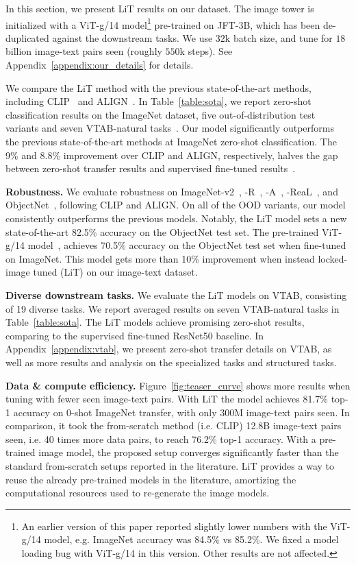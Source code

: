 \documentclass[10pt,twocolumn,letterpaper]{article}
\makeatletter
\def \lit {LiT\xspace}
\renewcommand*{\ie}{i.e.\@\xspace}
\def\objsota{82.5}
\makeatother
\begin{document}
In this section, we present \lit{} results on our dataset.
The image tower is initialized with a ViT-g/14 model\footnote{An earlier version of this paper reported slightly lower numbers with the ViT-g/14 model, e.g. ImageNet accuracy was 84.5\% vs 85.2\%. We fixed a model loading bug with ViT-g/14 in this version. Other results are not affected.} pre-trained on JFT-3B\cite{vitg}, which has been de-duplicated against the downstream tasks. 
We use $32$k batch size, and tune for $18$ billion image-text pairs seen (roughly $550$k steps). See Appendix~\ref{appendix:our_details} for details.

We compare the LiT method with the previous state-of-the-art methods, including CLIP~\cite{clip} and ALIGN~\cite{align}. 
In Table~\ref{table:sota}, we report zero-shot classification results on the ImageNet dataset, five out-of-distribution test variants and seven VTAB-natural tasks~\cite{vtab}.
%
Our model significantly outperforms the previous state-of-the-art methods at ImageNet zero-shot classification.
The 9\% and  8.8\% improvement over CLIP and ALIGN, respectively, halves the gap between zero-shot transfer results and supervised fine-tuned results~\cite{vitg,coatnet}.

\textbf{Robustness.}
We evaluate robustness on ImageNet-v2~\cite{imagenet_v2}, -R~\cite{imagenet_r,imagenet_sketch}, -A~\cite{imagenet_a}, -ReaL~\cite{imagenet_real}, and ObjectNet~\cite{objectnet}, following CLIP and ALIGN. 
On all of the OOD variants, our model consistently outperforms the previous models. 
Notably, the \lit{} model sets a new state-of-the-art \objsota{}\% accuracy on the ObjectNet test set.
The pre-trained ViT-g/14 model~\cite{vitg}, achieves 70.5\% accuracy on the ObjectNet test set when fine-tuned on ImageNet.
This model gets more than 10\% improvement when instead locked-image tuned (LiT) on our image-text dataset.

\textbf{Diverse downstream tasks.}
We evaluate the LiT models on VTAB, consisting of 19 diverse tasks.
We report averaged results on seven VTAB-natural tasks in Table~\ref{table:sota}. The LiT models achieve promising zero-shot results, comparing to the supervised fine-tuned ResNet50 baseline. 
In Appendix~\ref{appendix:vtab}, we present zero-shot transfer details on VTAB, as well as more results and analysis on the specialized tasks and structured tasks.

\textbf{Data \& compute efficiency.} Figure~\ref{fig:teaser_curve} shows more results when tuning with fewer seen image-text pairs. 
With \lit{} the model achieves 81.7\% top-1 accuracy on 0-shot ImageNet transfer, with only 300M image-text pairs seen.
In comparison, it took the from-scratch method (\ie CLIP) 12.8B image-text pairs seen, \ie 40 times more data pairs, to reach 76.2\% top-1 accuracy. 
With a pre-trained image model, the proposed setup converges significantly faster than the standard from-scratch setups reported in the literature.
\lit{} provides a way to reuse the already pre-trained models in the literature, amortizing the computational resources used to re-generate the image models.
\end{document}
